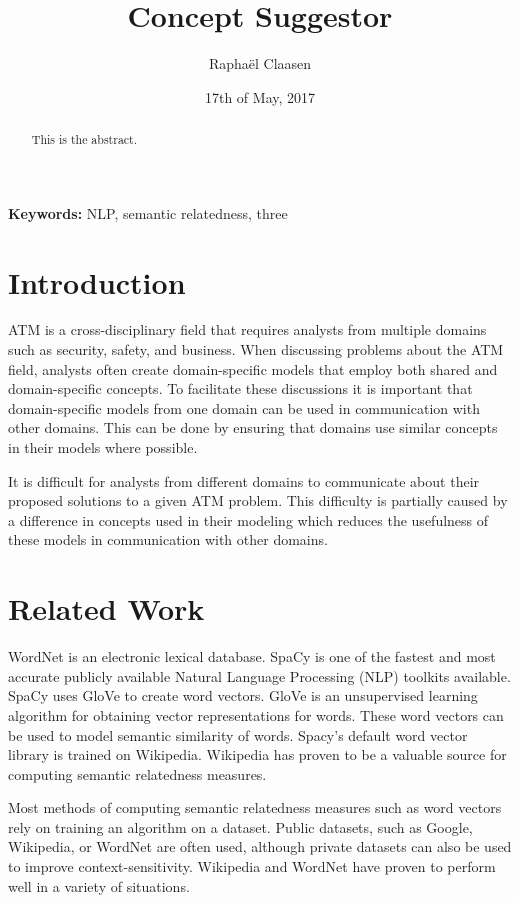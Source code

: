 \documentclass{article}
\title{Concept Suggestor}
\date{17th of May, 2017}
\author{Rapha\"el Claasen}
\begin{document}
\maketitle

\begin{abstract}
This is the abstract.
\end{abstract}

{\bf Keywords:} NLP, semantic relatedness, three

\section{Introduction}

ATM is a cross-disciplinary field that requires analysts from multiple domains such as security, safety, and business. When discussing problems about the ATM field, analysts often create domain-specific models that employ both shared and domain-specific concepts. To facilitate these discussions it is important that domain-specific models from one domain can be used in communication with other domains. This can be done by ensuring that domains use similar concepts in their models where possible.

It is difficult for analysts from different domains to communicate about their proposed solutions to a given ATM problem. This difficulty is partially caused by a difference in concepts used in their modeling which reduces the usefulness of these models in communication with other domains.

\section{Related Work}

WordNet is an electronic lexical database.\cite{kilgarriff2000wordnet}
SpaCy is one of the fastest and most accurate publicly available Natural Language Processing (NLP) toolkits available.\cite{choi2015depends}
SpaCy uses GloVe to create word vectors. GloVe is an unsupervised learning algorithm for obtaining vector representations for words.\cite{pennington2014glove} These word vectors can be used to model semantic similarity of words. Spacy's default word vector library is trained on Wikipedia. Wikipedia has proven to be a valuable source for computing semantic relatedness measures.\cite{strube2006wikirelate}

Most methods of computing semantic relatedness measures such as word vectors rely on training an algorithm on a dataset. Public datasets, such as Google, Wikipedia, or WordNet are often used, although private datasets can also be used to improve context-sensitivity. Wikipedia and WordNet have proven to perform well in a variety of situations.\cite{strube2006wikirelate}
\end{document}
